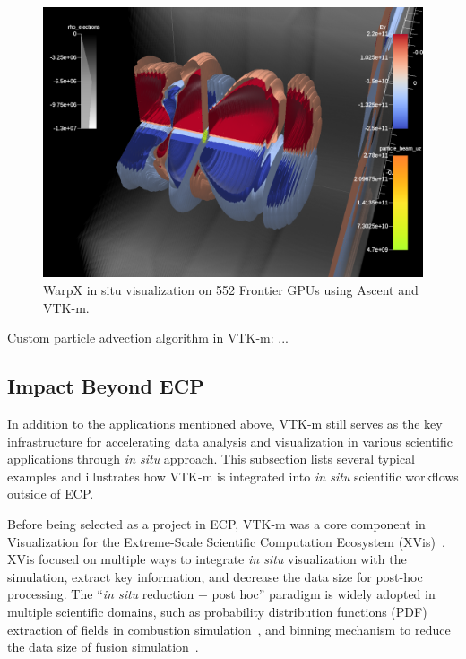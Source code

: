 \begin{figure}[htb]
  \includegraphics[width=\linewidth]{figures/warpx_stages_lwfa.png}
  \caption{WarpX in situ visualization on 552 Frontier GPUs using Ascent and VTK-m.}
  \label{fig:warpx_lwfa}
\end{figure}

Custom particle advection algorithm in VTK-m: ...

\subsection{Impact Beyond ECP}


In addition to the applications mentioned above, VTK-m still serves as the key infrastructure for accelerating data analysis and visualization in various scientific applications through \emph{in situ} approach. This subsection lists several typical examples and illustrates how VTK-m is integrated into \emph{in situ} scientific workflows outside of ECP.


Before being selected as a project in ECP, VTK-m was a core component in Visualization for the Extreme-Scale Scientific Computation Ecosystem (XVis)~\cite{Moreland2019}. 
XVis focused on multiple ways to integrate \emph{in situ} visualization with the simulation, extract key information, and decrease the data size for post-hoc processing.
The ``\emph{in situ} reduction + post hoc'' paradigm is widely adopted in multiple scientific domains, such as probability distribution functions (PDF) extraction of fields in combustion simulation~\cite{7874311}, and binning mechanism to reduce the data size of fusion simulation~\cite{Kress2018}. 


